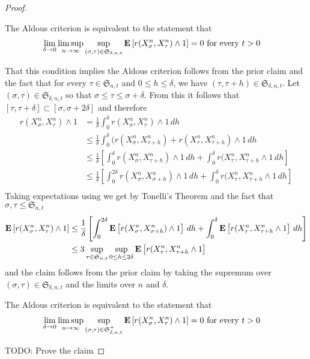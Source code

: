 \begin{proof}
\begin{clm}The Aldous criterion is equivalent to the statement that
\begin{align*}
\lim_{\delta \to 0} \limsup_{n \to \infty} \sup_{(\sigma, \tau) \in
  \mathfrak{S}_{\delta,n,t}} \textbf{E}\left[r(X^n_\sigma, X^n_\tau) \wedge
  1\right] &= 0 \text{ for every $t > 0$}
\end{align*}
\end{clm}
That this condition implies the Aldous criterion follows from the prior claim and the fact that for every $\tau \in \mathfrak{S}_{n,t}$ and $0 \leq h \leq \delta$, we have $(\tau, \tau+h) \in \mathfrak{S}_{\delta, n,t}$.
Let $(\sigma, \tau) \in \mathfrak{S}_{\delta,n,t}$ so that $\sigma \leq \tau \leq \sigma +\delta$.  From this it follows that $[\tau, \tau+ \delta] \subset [\sigma, \sigma + 2\delta]$ and therefore
\begin{align*}
r(X^n_\sigma, X^n_\tau) \wedge 1 &= \frac{1}{\delta} \int_0^\delta r(X^n_\sigma, X^n_\tau) \wedge 1 \, dh \\
&\leq \frac{1}{\delta} \int_0^\delta (r(X^n_\sigma, X^n_{\tau+h}) + r(X^n_\tau, X^n_{\tau+h}) \wedge 1 \, dh \\
&\leq \frac{1}{\delta} \left[ \int_0^\delta r(X^n_\sigma, X^n_{\tau+h}) \wedge 1 \, dh + \int_0^\delta r(X^n_\tau, X^n_{\tau+h} \wedge 1 \, dh \right ] \\
&\leq \frac{1}{\delta} \left[ \int_0^{2\delta} r(X^n_\sigma, X^n_{\sigma+h}) \wedge 1 \, dh + \int_0^\delta r(X^n_\tau, X^n_{\tau+h} \wedge 1 \, dh \right ] \\
\end{align*}
Taking expectations using we get by Tonelli's Theorem and the fact that $\sigma, \tau \leq \mathfrak{S}_{n,t}$
\begin{align*}
\textbf{E}\left[r(X^n_\sigma, X^n_\tau) \wedge 1\right] &\leq \frac{1}{\delta} \left[ \int_0^{2\delta} \textbf{E}\left[r(X^n_\sigma, X^n_{\sigma+h}) \wedge 1\right] \, dh + 
\int_0^\delta \textbf{E}\left[r(X^n_\tau, X^n_{\tau+h} \wedge 1\right] \, dh \right ] \\
&\leq 3 \sup_{\tau \in \mathfrak{S}_{n,t}} \sup_{0 \leq h \leq 2\delta} \textbf{E}\left[r(X^n_\tau, X^n_{\tau+h} \wedge 1\right]
\end{align*}
and the claim follows from the prior claim by taking the supremum over $(\sigma, \tau) \in \mathfrak{S}_{\delta,n,t}$ and the limits  over $n$ and $\delta$.

\begin{clm}The Aldous criterion is equivalent to the statement that
\begin{align*}
\lim_{\delta \to 0} \limsup_{n \to \infty} \sup_{(\sigma, \tau) \in
  \mathfrak{S}^+_{\delta,n,t}} \textbf{E}\left[r(X^n_\sigma, X^n_\tau) \wedge
  1\right] &= 0 \text{ for every $t > 0$}
\end{align*}
\end{clm}
TODO: Prove the claim


\end{proof}

